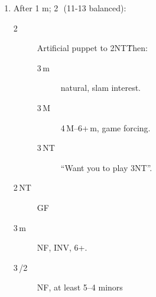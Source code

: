 \documentclass[12pt]{article}
\begin{document}
\begin{footnotesize}
\begin{enumerate}
\begin{enumerate}[label*=\arabic*,nosep]
            \item \label{itm:1d2m2h_resp} After 1\,\,m; 2\,\rh\ (11-13 balanced):
            \begin{description}
                \item [2\,\bs] Artificial puppet to 2NT\.
                    Then:
                \begin{description}
                    \item [3\,m] natural, slam interest.
                    \item [3\,M] 4\,M--6+\,m, game forcing.
                    \item[3\,NT] ``Want you to play 3NT''.
                \end{description}
                \item[2\,NT] GF\,
                \item[3\,m] NF, INV, 6+.
                \item[3\,\bc/2\,\rd] NF, at least 5--4 minors
            \end{description}
        \end{enumerate}
    \end{enumerate}
\end{footnotesize}
\end{document}
